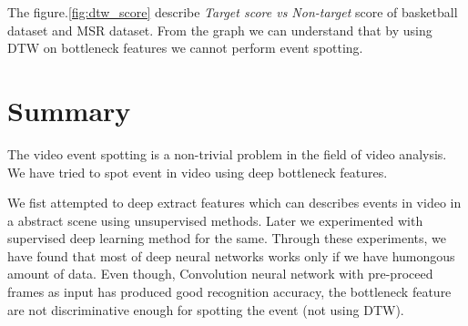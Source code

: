 The figure.\ref{fig:dtw_score} describe \textit{Target score vs Non-target} score of basketball dataset and MSR dataset. From the graph we can understand that by using DTW on bottleneck features we cannot perform event spotting.

\section{Summary}

The video event spotting is a non-trivial problem in the field of video analysis. We have tried to spot event in video using deep bottleneck features.

We fist attempted to deep extract features which can describes events in video in a abstract scene using unsupervised methods. Later we experimented with supervised deep learning method for the same. Through these experiments, we have found that most of deep neural networks works only if we have humongous amount of data. Even though, Convolution neural network with pre-proceed frames as input has produced good recognition accuracy, the bottleneck feature are not discriminative enough for spotting the event (not using DTW).